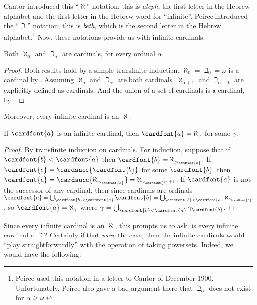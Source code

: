 \documentclass[../../../include/open-logic-section]{subfiles}
\begin{document}
Cantor introduced this ``$\aleph$'' notation; this is \emph{aleph}, the first letter in the Hebrew alphabet and the first letter in the Hebrew word for ``infinite''. Peirce introduced the ``$\beth$'' notation; this is \emph{beth}, which is the second letter in the Hebrew alphabet.\footnote{Peirce used this notation in a letter to Cantor of December 1900. Unfortunately, Peirce also gave a bad argument there that $\beth_\alpha$ does not exist for $\alpha \geq \omega$.} Now, these notations provide us with infinite cardinals.
\begin{prop}
	Both $\aleph_\alpha$ and $\beth_\alpha$ are cardinals, for every ordinal $\alpha$. 
\end{prop}
\begin{proof}
	Both results hold by a simple transfinite induction. $\aleph_0 = \beth_0 = \omega$ is a cardinal by . Assuming $\aleph_\alpha$ and $\beth_\alpha$ are both cardinals, $\aleph_{\alpha+1}$ and $\beth_{\alpha+1}$ are explicitly defined as cardinals. And the union of a set of cardinals is a cardinal, by .
\end{proof}\noindent
Moreover, every infinite cardinal is an $\aleph$:
\begin{prop}
	If $\cardfont{a}$ is an infinite cardinal, then $\cardfont{a} = \aleph_\gamma$ for some $\gamma$.
\end{prop}
\begin{proof}
	By transfinite induction on cardinals. For induction, suppose that if $\cardfont{b} < \cardfont{a}$ then $\cardfont{b} = \aleph_{\gamma_\cardfont{b}}$. If $\cardfont{a} = \cardsucc{\cardfont{b}}$ for some $\cardfont{b}$, then $\cardfont{a} = \cardsucc{\aleph_{\gamma_\cardfont{b}}}= \aleph_{\gamma_\cardfont{b}+1}$. If $\cardfont{a}$ is not the successor of any cardinal, then since cardinals are ordinals $\cardfont{a} = \bigcup_{\cardfont{b} < \cardfont{a}} \cardfont{b} = \bigcup_{\cardfont{b} < \cardfont{a}}{\aleph_{\gamma_\cardfont{b}}}$, so $\cardfont{a} = \aleph_\gamma$ where $\gamma = \bigcup_{\cardfont{b} < \cardfont{a}}\gamma_\cardfont{b}$. 
\end{proof}\noindent
Since every infinite cardinal is an $\aleph$, this prompts us to ask: is every infinite cardinal a $\beth$? Certainly if that \emph{were} the case, then the infinite cardinals would ``play straightforwardly'' with the operation of taking powersets. Indeed, we would have the following:
\end{document}
